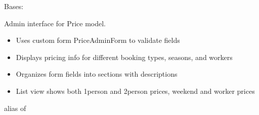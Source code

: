 \documentclass[letterpaper,10pt,english]{sphinxmanual}
\begin{document}

\begin{fulllineitems}
\label{\detokenize{index:bookings.admin.PriceAdmin}}
\pysigstartsignatures
\pysiglinewithargsret
{}
{\sphinxparamcomma {}}
{}
\pysigstopsignatures
\sphinxAtStartPar
Bases: 

\sphinxAtStartPar
Admin interface for Price model.
\begin{itemize}
\item {} 
\sphinxAtStartPar
Uses custom form PriceAdminForm to validate fields

\item {} 
\sphinxAtStartPar
Displays pricing info for different booking types, seasons, and workers

\item {} 
\sphinxAtStartPar
Organizes form fields into sections with descriptions

\item {} 
\sphinxAtStartPar
List view shows both 1\sphinxhyphen{}person and 2\sphinxhyphen{}person prices, weekend and worker prices

\end{itemize}

\begin{fulllineitems}
\label{\detokenize{index:bookings.admin.PriceAdmin.form}}
\pysigstartsignatures
\pysigline
{}
\pysigstopsignatures
\sphinxAtStartPar
alias of {\hyperref[\detokenize{index:bookings.admin.PriceAdminForm}]{}}

\end{fulllineitems}



\end{fulllineitems}
\end{document}

